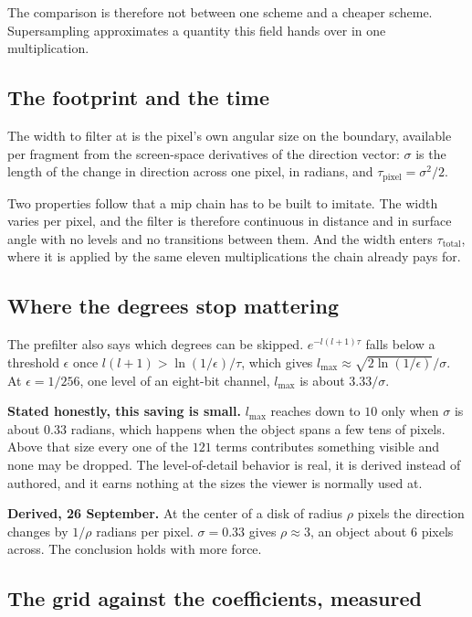 The comparison is therefore not between one scheme and a cheaper scheme. Supersampling approximates a quantity this field hands over in one multiplication.

\subsection{The footprint and the time}

The width to filter at is the pixel's own angular size on the boundary, available per fragment from the screen-space derivatives of the direction vector: \(\sigma\) is the length of the change in direction across one pixel, in radians, and \(\tau_{\text{pixel}} = \sigma^2/2\).

Two properties follow that a mip chain has to be built to imitate. The width varies per pixel, and the filter is therefore continuous in distance and in surface angle with no levels and no transitions between them. And the width enters \(\tau_{\text{total}}\), where it is applied by the same eleven multiplications the chain already pays for.

\subsection{Where the degrees stop mattering}

The prefilter also says which degrees can be skipped. \(e^{-l(l+1)\tau}\) falls below a threshold \(\epsilon\) once \(l(l+1) > \ln(1/\epsilon)/\tau\), which gives \(l_{\max} \approx \sqrt{2\ln(1/\epsilon)}/\sigma\). At \(\epsilon = 1/256\), one level of an eight-bit channel, \(l_{\max}\) is about \(3.33/\sigma\).

\textbf{Stated honestly, this saving is small.} \(l_{\max}\) reaches down to \(10\) only when \(\sigma\) is about \(0.33\) radians, which happens when the object spans a few tens of pixels. Above that size every one of the \(121\) terms contributes something visible and none may be dropped. The level-of-detail behavior is real, it is derived instead of authored, and it earns nothing at the sizes the viewer is normally used at.

\textbf{Derived, 26 September.} At the center of a disk of radius \(\rho\) pixels the direction changes by \(1/\rho\) radians per pixel. \(\sigma = 0.33\) gives \(\rho \approx 3\), an object about \(6\) pixels across. The conclusion holds with more force.

\subsection{The grid against the coefficients, measured}

